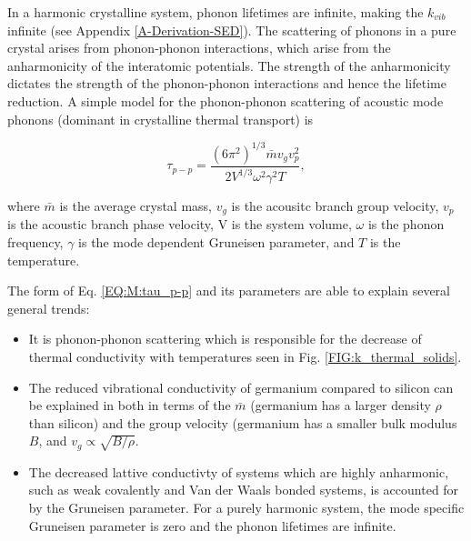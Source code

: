 \documentclass[letterpaper,12pt]{article}
\begin{document}
In a harmonic crystalline system, phonon lifetimes are infinite, making the $k_{vib}$ infinite (see Appendix \ref{A-Derivation-SED}). The scattering of phonons in a pure crystal arises from phonon-phonon interactions, which arise from the anharmonicity of the interatomic potentials. The strength of the anharmonicity dictates the strength of the phonon-phonon interactions and hence the lifetime reduction.\cite{turney2008b}  A simple model for the phonon-phonon scattering of acoustic mode phonons (dominant in crystalline thermal transport) is

\begin{equation}\label{EQ:M:tau_p-p}
\tau_{p-p} = \frac{(6 \pi^2)^{1/3} \bar m v_g v_p^2}{2 V^{1/3} \omega^2 \gamma^2 T },
\end{equation}

where $\bar m$ is the average crystal mass, $v_g$ is the acousitc branch group velocity, $v_p$ is the acoustic branch phase velocity, V is the system volume, $\omega$ is the phonon frequency, $\gamma$ is the mode dependent Gruneisen parameter, and $T$ is the temperature.\cite{callaway1959,holland1963} 

The form of Eq$.$ \eqref{EQ:M:tau_p-p} and its parameters are able to explain several general trends:

\begin{itemize}
\item It is phonon-phonon scattering which is responsible for the decrease of thermal conductivity with temperatures seen in Fig. \ref{FIG:k_thermal_solids}. 

\item The reduced vibrational conductivity of germanium compared to silicon can be explained in both in terms of the $\bar m$ (germanium has a larger density $\rho$ than silicon) and the group velocity (germanium has a smaller bulk modulus $B$, and $v_g \propto \sqrt{B/\rho}$.

\item The decreased lattive conductivty of systems which are highly anharmonic, such as weak covalently and Van der Waals bonded systems,\cite{costescu2004} is accounted for by the Gruneisen parameter.  For a purely harmonic system, the mode specific Gruneisen parameter is zero and the phonon lifetimes are infinite.
\end{itemize}
\end{document}
